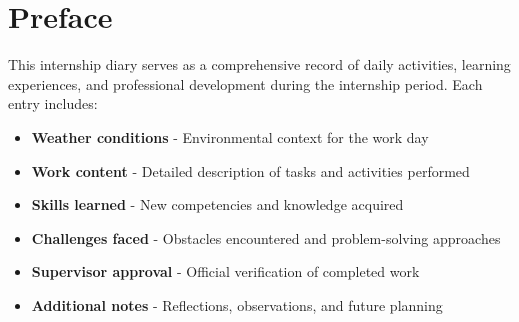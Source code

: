\documentclass[12pt,a4paper,oneside]{book}
\begin{document}
\vfill
\begin{center}
\end{center}
\vfill

\cleardoublepage

\tableofcontents

\cleardoublepage

\chapter*{Preface}
{}

This internship diary serves as a comprehensive record of daily activities, learning experiences, and professional development during the internship period. Each entry includes:

\begin{itemize}
    \item \textbf{Weather conditions} - Environmental context for the work day
    \item \textbf{Work content} - Detailed description of tasks and activities performed
    \item \textbf{Skills learned} - New competencies and knowledge acquired
    \item \textbf{Challenges faced} - Obstacles encountered and problem-solving approaches
    \item \textbf{Supervisor approval} - Official verification of completed work
    \item \textbf{Additional notes} - Reflections, observations, and future planning
\end{itemize}
\end{document}
